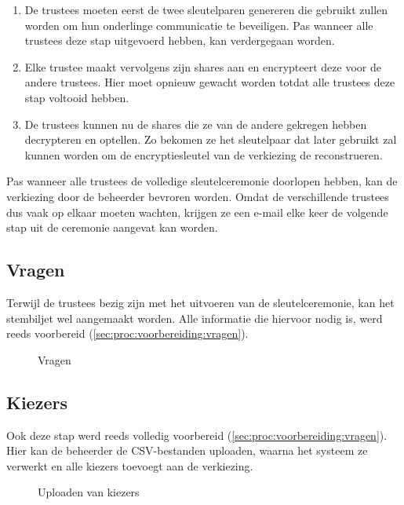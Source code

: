 \begin{enumerate}
  \item De trustees moeten eerst de twee sleutelparen genereren die gebruikt zullen worden om hun onderlinge communicatie te beveiligen. Pas wanneer alle trustees deze stap uitgevoerd hebben, kan verdergegaan worden.
  \item Elke trustee maakt vervolgens zijn shares aan en encrypteert deze voor de andere trustees. Hier moet opnieuw gewacht worden totdat alle trustees deze stap voltooid hebben.
  \item De trustees kunnen nu de shares die ze van de andere gekregen hebben decrypteren en optellen. Zo bekomen ze het sleutelpaar dat later gebruikt zal kunnen worden om de encryptiesleutel van de verkiezing de reconstrueren.
\end{enumerate}

Pas wanneer alle trustees de volledige sleutelceremonie doorlopen hebben, kan de verkiezing door de beheerder bevroren worden. Omdat de verschillende trustees dus vaak op elkaar moeten wachten, krijgen ze een e-mail elke keer de volgende stap uit de ceremonie aangevat kan worden.

\subsection{Vragen}

Terwijl de trustees bezig zijn met het uitvoeren van de sleutelceremonie, kan het stembiljet wel aangemaakt worden. Alle informatie die hiervoor nodig is, werd reeds voorbereid (\ref{sec:proc:voorbereiding:vragen}).

\begin{figure}
  \caption{Vragen}
  \label{fig:proc:questions}
\end{figure}

\subsection{Kiezers}

Ook deze stap werd reeds volledig voorbereid (\ref{sec:proc:voorbereiding:vragen}). Hier kan de beheerder de CSV-bestanden uploaden, waarna het systeem ze verwerkt en alle kiezers toevoegt aan de verkiezing.

\begin{figure}
  \caption{Uploaden van kiezers}
  \label{fig:proc:voters_upload}
\end{figure}

